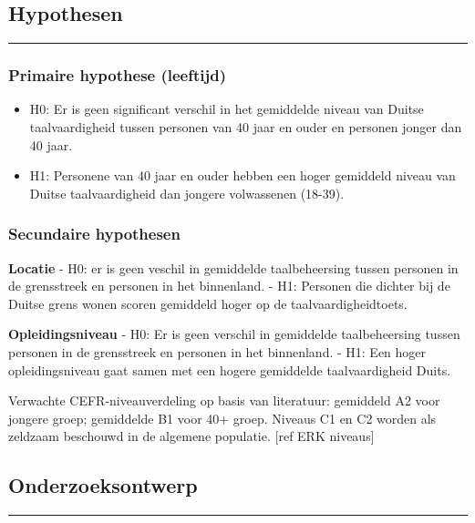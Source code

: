 \documentclass[
]{article}
\providecommand{\tightlist}{%
  \setlength{\itemsep}{0pt}\setlength{\parskip}{0pt}}
\begin{document}
\subsection{Hypothesen}\label{hypothesen}

\begin{center}\rule{0.5\linewidth}{0.5pt}\end{center}

\subsubsection{Primaire hypothese
(leeftijd)}\label{primaire-hypothese-leeftijd}

\begin{itemize}
\tightlist
\item
  H0: Er is geen significant verschil in het gemiddelde niveau van
  Duitse taalvaardigheid tussen personen van 40 jaar en ouder en
  personen jonger dan 40 jaar.
\item
  H1: Personene van 40 jaar en ouder hebben een hoger gemiddeld niveau
  van Duitse taalvaardigheid dan jongere volwassenen (18-39).
\end{itemize}

\subsubsection{Secundaire hypothesen}\label{secundaire-hypothesen}

\textbf{Locatie} - H0: er is geen veschil in gemiddelde taalbeheersing
tussen personen in de grensstreek en personen in het binnenland. - H1:
Personen die dichter bij de Duitse grens wonen scoren gemiddeld hoger op
de taalvaardigheidtoets.

\textbf{Opleidingsniveau} - H0: Er is geen verschil in gemiddelde
taalbeheersing tussen personen in de grensstreek en personen in het
binnenland. - H1: Een hoger opleidingsniveau gaat samen met een hogere
gemiddelde taalvaardigheid Duits.

Verwachte CEFR-niveauverdeling op basis van literatuur: gemiddeld A2
voor jongere groep; gemiddelde B1 voor 40+ groep. Niveaus C1 en C2
worden als zeldzaam beschouwd in de algemene populatie. {[}ref ERK
niveaus{]}

\subsection{Onderzoeksontwerp}\label{onderzoeksontwerp}

\begin{center}\rule{0.5\linewidth}{0.5pt}\end{center}
\end{document}
